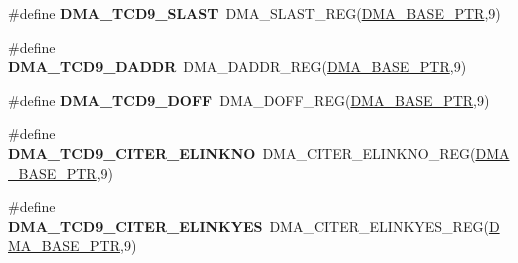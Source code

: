\begin{DoxyCompactItemize}
\item 
\hypertarget{group___d_m_a___register___accessor___macros_gabce4d11e5b7029e3466399882977542f}{}\#define {\bfseries D\+M\+A\+\_\+\+T\+C\+D9\+\_\+\+S\+L\+A\+S\+T}~D\+M\+A\+\_\+\+S\+L\+A\+S\+T\+\_\+\+R\+E\+G(\hyperlink{group___d_m_a___peripheral_ga6997fbc1b1973e9f27170217a3bd6f22}{D\+M\+A\+\_\+\+B\+A\+S\+E\+\_\+\+P\+T\+R},9)\label{group___d_m_a___register___accessor___macros_gabce4d11e5b7029e3466399882977542f}

\item 
\hypertarget{group___d_m_a___register___accessor___macros_ga9acd2cbb405259e09039ecddb5a0b278}{}\#define {\bfseries D\+M\+A\+\_\+\+T\+C\+D9\+\_\+\+D\+A\+D\+D\+R}~D\+M\+A\+\_\+\+D\+A\+D\+D\+R\+\_\+\+R\+E\+G(\hyperlink{group___d_m_a___peripheral_ga6997fbc1b1973e9f27170217a3bd6f22}{D\+M\+A\+\_\+\+B\+A\+S\+E\+\_\+\+P\+T\+R},9)\label{group___d_m_a___register___accessor___macros_ga9acd2cbb405259e09039ecddb5a0b278}

\item 
\hypertarget{group___d_m_a___register___accessor___macros_ga1a52f2942d7c84c64a15aaa7d8d989ec}{}\#define {\bfseries D\+M\+A\+\_\+\+T\+C\+D9\+\_\+\+D\+O\+F\+F}~D\+M\+A\+\_\+\+D\+O\+F\+F\+\_\+\+R\+E\+G(\hyperlink{group___d_m_a___peripheral_ga6997fbc1b1973e9f27170217a3bd6f22}{D\+M\+A\+\_\+\+B\+A\+S\+E\+\_\+\+P\+T\+R},9)\label{group___d_m_a___register___accessor___macros_ga1a52f2942d7c84c64a15aaa7d8d989ec}

\item 
\hypertarget{group___d_m_a___register___accessor___macros_ga058c1b0e7625a041c6fff963a6de5af9}{}\#define {\bfseries D\+M\+A\+\_\+\+T\+C\+D9\+\_\+\+C\+I\+T\+E\+R\+\_\+\+E\+L\+I\+N\+K\+N\+O}~D\+M\+A\+\_\+\+C\+I\+T\+E\+R\+\_\+\+E\+L\+I\+N\+K\+N\+O\+\_\+\+R\+E\+G(\hyperlink{group___d_m_a___peripheral_ga6997fbc1b1973e9f27170217a3bd6f22}{D\+M\+A\+\_\+\+B\+A\+S\+E\+\_\+\+P\+T\+R},9)\label{group___d_m_a___register___accessor___macros_ga058c1b0e7625a041c6fff963a6de5af9}

\item 
\hypertarget{group___d_m_a___register___accessor___macros_ga0d2e7773109a62951a808fab4a29515f}{}\#define {\bfseries D\+M\+A\+\_\+\+T\+C\+D9\+\_\+\+C\+I\+T\+E\+R\+\_\+\+E\+L\+I\+N\+K\+Y\+E\+S}~D\+M\+A\+\_\+\+C\+I\+T\+E\+R\+\_\+\+E\+L\+I\+N\+K\+Y\+E\+S\+\_\+\+R\+E\+G(\hyperlink{group___d_m_a___peripheral_ga6997fbc1b1973e9f27170217a3bd6f22}{D\+M\+A\+\_\+\+B\+A\+S\+E\+\_\+\+P\+T\+R},9)\label{group___d_m_a___register___accessor___macros_ga0d2e7773109a62951a808fab4a29515f}


\end{DoxyCompactItemize}
